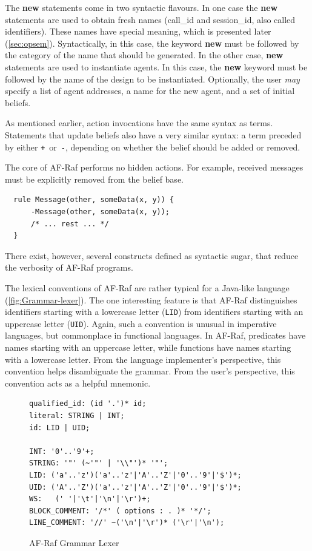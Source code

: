 \documentclass[a4paper,12pt,oneside,fleqn]{book} %
\begin{document}
{The {\bf new} statements come in two syntactic flavours. In one case the
{\bf new} statements are used to obtain fresh names (call\_id and
session\_id, also called identifiers). These names have special meaning,
which is presented later (\autoref{sec:opsem}). Syntactically, in this
case, the keyword {\bf new} must be followed by the category of the name
that should be generated. In the other case, {\bf new} statements are used
to instantiate agents. In this case, the {\bf new} keyword must be followed
by the name of the design to be instantiated. Optionally, the user
\emph{may} specify a list of agent addresses, a name for the new agent, and
a set of initial beliefs.

As mentioned earlier, action invocations have the same syntax as terms.
Statements that update beliefs also have a very similar syntax: a term
preceded by either \verb-+-~or~\verb+-+, depending on whether the belief
should be added or removed.

\begin{example}
The core of AF-Raf performs no hidden actions. For example, received
messages must be explicitly removed from the belief base.
\begin{verbatim}
  rule Message(other, someData(x, y)) {
      -Message(other, someData(x, y));
      /* ... rest ... */
  }
\end{verbatim}
There exist, however, several constructs defined as syntactic sugar, that
reduce the verbosity of AF-Raf programs.
\end{example}

The lexical conventions of AF-Raf are rather typical for a Java-like
language (\autoref{fig:Grammar-lexer}). The one interesting feature is that
AF-Raf distinguishes identifiers starting with a lowercase letter
(\verb+LID+) from identifiers starting with an uppercase letter
(\verb+UID+). Again, such a convention is unusual in imperative languages,
but commonplace in functional languages. In AF-Raf, predicates have names
starting with an uppercase letter, while functions have names starting with
a lowercase letter. From the language implementer's perspective, this
convention helps disambiguate the grammar. From the user's perspective,
this convention acts as a helpful mnemonic.

\begin{figure}\footnotesize %
\begin{verbatim}
qualified_id: (id '.')* id;
literal: STRING | INT;
id: LID | UID;

INT: '0'..'9'+;
STRING: '"' (~'"' | '\\"')* '"';
LID: ('a'..'z')('a'..'z'|'A'..'Z'|'0'..'9'|'$')*;
UID: ('A'..'Z')('a'..'z'|'A'..'Z'|'0'..'9'|'$')*;
WS:   (' '|'\t'|'\n'|'\r')+;
BLOCK_COMMENT: '/*' ( options : . )* '*/';
LINE_COMMENT: '//' ~('\n'|'\r')* ('\r'|'\n');
\end{verbatim}
\caption{AF-Raf Grammar Lexer}
\label{fig:Grammar-lexer}
\end{figure} %
}
\end{document}
